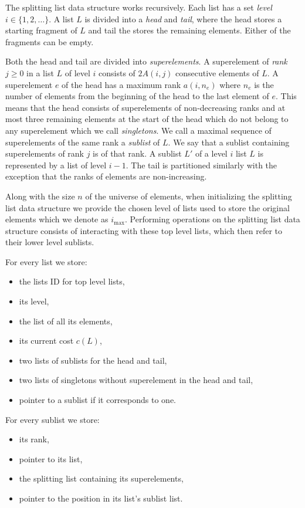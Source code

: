 The splitting list data structure works recursively. Each list has a set \textit{level} $i \in \{1, 2, \dots \}$. A list $L$ is divided into a \textit{head} and \textit{tail}, where the head stores a starting fragment of $L$ and tail the stores the remaining elements. Either of the fragments can be empty. 

Both the head and tail are divided into \textit{superelements}. A superelement of \textit{rank} $j \geq 0$ in a list $L$ of level $i$ consists of $2A(i,j)$ consecutive elements of $L$. A superelement $e$ of the head has a maximum rank $a(i, n_e)$ where $n_e$ is the number of elements from the beginning of the head to the last element of $e$. This means that the head consists of superelements of non-decreasing ranks and at most three remaining elements at the start of the head which do not belong to any superelement which we call \textit{singletons}. We call a maximal sequence of superelements of the same rank a \textit{sublist} of $L$. We say that a sublist containing superelements of rank $j$ is of that rank. A sublist $L'$ of a level $i$ list $L$ is represented by a list of level $i-1$. The tail is partitioned similarly with the exception that the ranks of elements are non-increasing. 

Along with the size $n$ of the universe of elements, when initializing the splitting list data structure we provide the chosen level of lists used to store the original elements which we denote as $i_{\max}$. Performing operations on the splitting list data structure consists of interacting with these top level lists, which then refer to their lower level sublists.

For every list we store:

\begin{itemize}
    \item the lists ID for top level lists,
    \item its level,
    \item the list of all its elements,
    \item its current cost $c(L)$,
    \item two lists of sublists for the head and tail,
    \item two lists of singletons without superelement in the head and tail,
    \item pointer to a sublist if it corresponds to one.
\end{itemize}

For every sublist we store:

\begin{itemize}
    \item its rank,
    \item pointer to its list,
    \item the splitting list containing its superelements,
    \item pointer to the position in its list's sublist list.
\end{itemize}


